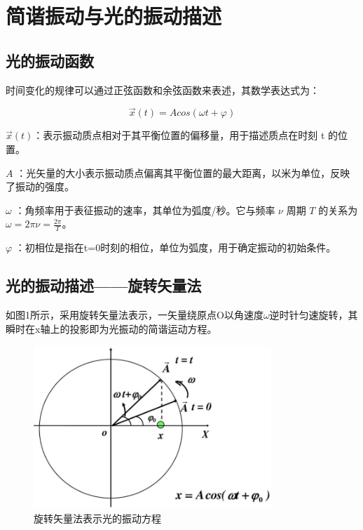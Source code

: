 \documentclass[withoutpreface,bwprint]{cumcmthesis} %
\begin{document}
\newpage
\begin{appendices} \label{app:optical_basis}
    \section{简谐振动与光的振动描述}
    \subsection{光的振动函数}
    时间变化的规律可以通过正弦函数和余弦函数来表述，其数学表达式为：

    \[\overrightarrow{x}(t) = Acos(\omega t + \varphi)\]

    \(\overrightarrow{x}(t)\)：表示振动质点相对于其平衡位置的偏移量，用于描述质点在时刻 t 的位置。

    \(A\) ：光矢量的大小表示振动质点偏离其平衡位置的最大距离，以米为单位，反映了振动的强度。

    \(\omega\) ：角频率用于表征振动的速率，其单位为弧度/秒。它与频率 \(\nu\) 周期 \(T\) 的关系为 \(\omega = 2\pi\nu = \frac{2\pi}{T}\)。

    \(\varphi\) ：初相位是指在t=0时刻的相位，单位为弧度，用于确定振动的初始条件。

    \subsection{光的振动描述——旋转矢量法}
    如图1所示，采用旋转矢量法表示，一矢量绕原点O以角速度$\omega$逆时针匀速旋转，其瞬时在x轴上的投影即为光振动的简谐运动方程。

    \begin{figure}[!h]
        \centering
        \includegraphics[width=0.8\textwidth]{figures/figure1.png} %

        \caption{旋转矢量法表示光的振动方程}
        \label{fig:1}
    \end{figure}


\end{appendices}
\end{document}
